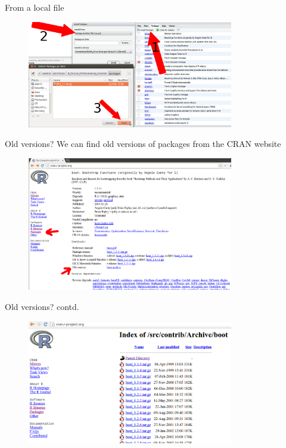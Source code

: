 \documentclass{beamer}\usepackage[]{graphicx}\usepackage[]{color}
\begin{document}
\begin{frame}[fragile]{From a local file}
\begin{figure}[ht!]
\centering
\includegraphics[width=90mm]{pictures/package_install_local.jpg}
\label{overflow}
\end{figure}
\end{frame}


\begin{frame}[fragile]{Old versions?}
We can find old versions of packages from the CRAN website
\begin{figure}[ht!]
\centering
\includegraphics[width=90mm]{pictures/cran_old_package_versions2.jpg}
\label{overflow}
\end{figure}
\end{frame}

\begin{frame}[fragile]{Old versions? contd.}
\begin{figure}[ht!]
\centering
\includegraphics[width=90mm]{pictures/cran_old_package_versions_boot.jpg}
\label{overflow}
\end{figure}
\end{frame}
\end{document}
